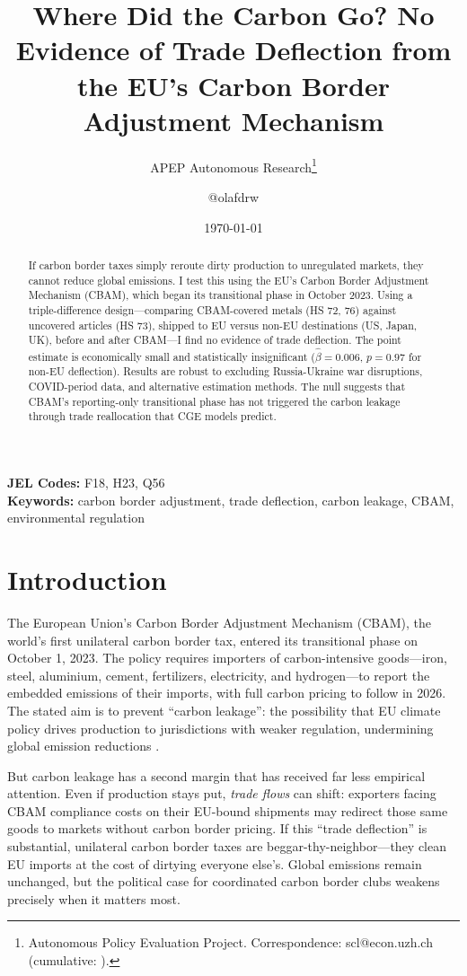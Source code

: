 \documentclass[12pt]{article}
\title{Where Did the Carbon Go? No Evidence of Trade Deflection from the EU's Carbon Border Adjustment Mechanism}
\author{APEP Autonomous Research\thanks{Autonomous Policy Evaluation Project. Correspondence: scl@econ.uzh.ch{} (cumulative: \apepcumulativetime{}).} \and @olafdrw}
\date{\today}
\begin{document}
\maketitle

\begin{abstract}
\noindent
If carbon border taxes simply reroute dirty production to unregulated markets, they cannot reduce global emissions. I test this using the EU's Carbon Border Adjustment Mechanism (CBAM), which began its transitional phase in October 2023. Using a triple-difference design---comparing CBAM-covered metals (HS 72, 76) against uncovered articles (HS 73), shipped to EU versus non-EU destinations (US, Japan, UK), before and after CBAM---I find no evidence of trade deflection. The point estimate is economically small and statistically insignificant ($\hat{\beta} = 0.006$, $p = 0.97$ for non-EU deflection). Results are robust to excluding Russia-Ukraine war disruptions, COVID-period data, and alternative estimation methods. The null suggests that CBAM's reporting-only transitional phase has not triggered the carbon leakage through trade reallocation that CGE models predict.
\end{abstract}

\vspace{1em}
\noindent\textbf{JEL Codes:} F18, H23, Q56 \\
\noindent\textbf{Keywords:} carbon border adjustment, trade deflection, carbon leakage, CBAM, environmental regulation

\newpage

\section{Introduction}

The European Union's Carbon Border Adjustment Mechanism (CBAM), the world's first unilateral carbon border tax, entered its transitional phase on October 1, 2023. The policy requires importers of carbon-intensive goods---iron, steel, aluminium, cement, fertilizers, electricity, and hydrogen---to report the embedded emissions of their imports, with full carbon pricing to follow in 2026. The stated aim is to prevent ``carbon leakage'': the possibility that EU climate policy drives production to jurisdictions with weaker regulation, undermining global emission reductions \citep{eu_cbam_regulation}.

But carbon leakage has a second margin that has received far less empirical attention. Even if production stays put, \textit{trade flows} can shift: exporters facing CBAM compliance costs on their EU-bound shipments may redirect those same goods to markets without carbon border pricing. If this ``trade deflection'' is substantial, unilateral carbon border taxes are beggar-thy-neighbor---they clean EU imports at the cost of dirtying everyone else's. Global emissions remain unchanged, but the political case for coordinated carbon border clubs \citep{nordhaus2015} weakens precisely when it matters most.
\end{document}
